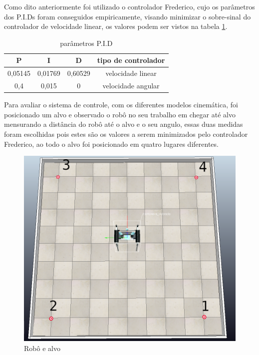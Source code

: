 Como dito anteriormente foi utilizado o controlador Frederico,
cujo os parâmetros dos P.I.Ds foram conseguidos empiricamente,
visando minimizar o sobre-sinal do controlador de velocidade linear,
os valores podem ser vistos na tabela \ref{table:pid:}.

\begin{table}[H]
    \label{table:pid:}
    \centering
    \begin{tabular}{c|c|c|c}
        \hline
        P & I & D & tipo de controlador \\
        \hline
        0,05145 & 0,01769 & 0,60529 & velocidade linear \\
        \hline
        0,4 & 0,015 & 0 & velocidade angular \\
        \hline
    \end{tabular}
    \caption{parâmetros P.I.D}
\end{table}

Para avaliar o sistema de controle, com os diferentes modelos
cinemática, foi posicionado um alvo e observado o robô no seu
trabalho em chegar até alvo mensurando a distância do robô até
o alvo e o seu angulo, essas duas medidas foram escolhidas pois 
estes são os valores a serem minimizados pelo controlador Frederico,
ao todo o alvo foi posicionado em quatro lugares diferentes.

\begin{figure}[H]
    \centering
    \includegraphics[scale=0.3]{figuras/robo_e_alvo.png}
    \caption{Robô e alvo}
\end{figure}

